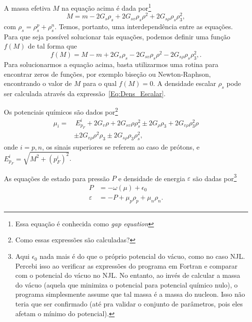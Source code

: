 A massa efetiva $M$ na equação acima é dada por\footnote{Essa equação é conhecida como \emph{gap equation}}
\begin{equation}\label{Eq:Gap}
	M = m - 2G_s\rho_s + 2G_{sv}\rho_s\rho^2 + 2 G_{s\rho}\rho_s\rho_3^2,
\end{equation}
%
com $\rho_s = \rho_s^p + \rho_s^n$. Temos, portanto, uma interdependência entre as equações. Para que seja possível solucionar tais equações, podemos definir uma função $f(M)$ de tal forma que
\begin{equation}\label{Eq:Gap_zero}
	f(M) = M - m + 2G_s\rho_s - 2G_{sv}\rho_s\rho^2 - 2 G_{s\rho}\rho_s\rho_3^2,.
\end{equation}
%
Para solucionarmos a equação acima, basta utilizarmos uma rotina para encontrar zeros de funções, por exemplo biseção ou Newton-Raphson, encontrando o valor de $M$ para o qual $f(M) = 0$. A densidade escalar $\rho_s$ pode ser calculada através da expressão~\eqref{Eq:Dens_Escalar}.

Os potenciais químicos são dados por\footnote{Como essas expressões são calculadas?}
\begin{equation}\label{Eq:Potenciais_Quimicos}
\begin{split}
	\mu_i =&~ E_{p_F}^i + 2G_v\rho + 2G_{sv}\rho\rho_s^2 \pm 2G_\rho\rho_3+2G_{v\rho}\rho_3^2\rho \\
	& \pm 2G_{v\rho}\rho^2\rho_3 \pm 2 G_{s\rho}\rho_3\rho_s^2,
\end{split}
\end{equation}
%
onde $i = p,n$, os sinais superiores se referem ao caso de prótons, e $E_{p_F}^i = \sqrt{M^2 + (p_F^i)^2}$.

As equações de estado para pressão $P$ e densidade de energia $\varepsilon$ são dadas por\footnote{Aqui $\epsilon_0$ nada mais é do que o próprio potencial do vácuo, como no caso NJL. Percebi isso ao verificar as expressões do programa em Fortran e comparar com o potencial do vácuo no NJL. No entanto, ao invés de calcular a massa do vácuo (aquela que minimiza o potencial para potencial químico nulo), o programa simplesmente assume que tal massa é a massa do nucleon. Isso não teria que ser confirmado (até pra validar o conjunto de parâmetros, pois eles afetam o mínimo do potencial).}
\begin{align}
	P &= -\omega(\mu) + \epsilon_0 \label{Eq:Pressao}\\
	\varepsilon &= -P + \mu_p\rho_p + \mu_n\rho_n. \label{Eq:Densidade_energia}
\end{align}

